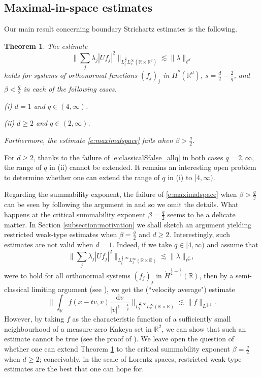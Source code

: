 \documentclass[a4paper]{amsart}
\numberwithin{equation}{section}%
\theoremstyle{plain}%
\newtheorem{theorem}{Theorem}[section]
\theoremstyle{definition}
\theoremstyle{remark}%
\def\d{\mathrm{d}}
\newcommand{\R}{{\mathbb R}}
\begin{document}
\subsection{Maximal-in-space estimates} \label{subsection:Strichartz}
Our main result concerning boundary Strichartz estimates is the following. 
\begin{theorem} \label{t:maximalspace}
The estimate 
\begin{equation} \label{e:maximalspace} 
\bigg\| \sum_j \lambda_j |Uf_j|^2 \bigg\|_{L^{\frac{q}{2}}_tL^\infty_x(\mathbb{R} \times \mathbb{R}^d)} \lesssim \| \lambda \|_{\ell^\beta}
\end{equation}
holds for systems of orthonormal functions $(f_j)_j$ in $\dot{H}^{s}(\mathbb{R}^d)$, $s = \frac{d}{2} - \frac{2}{q}$, and $\beta < \frac{q}{2}$ in each of the following cases.

\emph{(i)} $d = 1$ and $q \in (4,\infty)$. 

\emph{(ii)} $d \geq 2$ and $q \in (2,\infty)$.

\noindent Furthermore, the estimate \eqref{e:maximalspace} fails when $\beta > \frac{q}{2}$.
\end{theorem}
 For $d \geq 2$, thanks to the failure of \eqref{e:classicalSfalse_allq} in both cases $q = 2, \infty$, the range of $q$ in (ii) cannot be extended. It remains an interesting open problem to determine whether one can extend the range of $q$ in (i) to $[4,\infty)$. 
 
 Regarding the summability exponent, the failure of \eqref{e:maximalspace} when $\beta > \frac{q}{2}$ can be seen by following the argument in \cite[Section 4.8]{BHLNS} and so we omit the details. What happens at the critical summability exponent $\beta = \frac{q}{2}$ seems to be a delicate matter. In Section \ref{subsection:motivation} we shall sketch an argument yielding restricted weak-type estimates when $\beta = \frac{q}{2}$ and $d \geq 2$. Interestingly, such estimates are not valid when $d = 1$. Indeed, if we take $q \in [4,\infty)$ and assume that
 \begin{equation} \label{est:sharpnessTheorem1.2}
\bigg\| \sum_j \lambda_j |Uf_j|^2 \bigg\|_{L^{\frac{q}{2},\infty}_tL^{\infty}_x(\R \times \R)} \lesssim \| \lambda \|_{\ell^{\frac{q}{2},1}}
\end{equation}
were to hold for all orthonormal systems $(f_j)_j$ in $\dot{H}^{\frac12 - \frac2q}(\R)$, then by a semi-classical limiting argument (see \cite{Sabin_survey, BHLNS}), we get the (``velocity average") estimate
\[
\biggl\| \int_{\R} f(x-tv, v) \frac{\d v}{|v|^{1- \frac{4}{q}}} \biggr\|_{L_t^{\frac{q}{2},\infty} L_x^{\infty}(\R \times \R)} \lesssim 
\|f \|_{L^{\frac{q}{2},1}}.
\]
However, by taking $f$ as the characteristic function of a sufficiently small neighbourhood of a measure-zero Kakeya set in $\R^2$, we can show that such an estimate cannot be true (see the proof of \cite[Theorem 5.3]{BHLNS}). We leave open the question of whether one can extend Theorem \ref{t:maximalspace} to the critical summability exponent $\beta = \frac{q}{2}$ when $d \geq 2$; conceivably, in the scale of Lorentz spaces, restricted weak-type estimates are the best that one can hope for.
\end{document}
